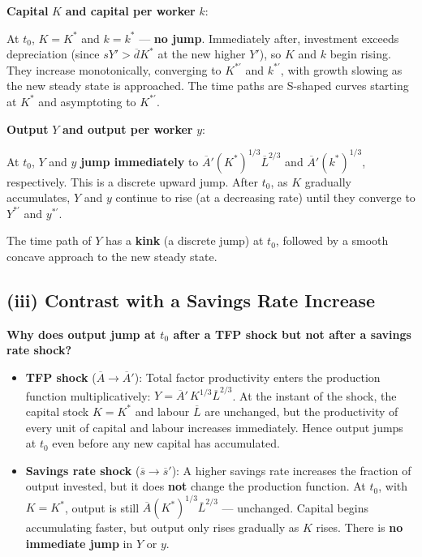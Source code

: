 \documentclass[letterpaper,12pt]{article}
\begin{document}
\noindent\textbf{Capital} $K$ \textbf{and capital per worker} $k$:

At $t_0$, $K = K^*$ and $k = k^*$ — \textbf{no jump}. Immediately after, investment exceeds depreciation (since $sY' > \overline{d}K^*$ at the new higher $Y'$), so $K$ and $k$ begin rising. They increase monotonically, converging to $K^{*\prime}$ and $k^{*\prime}$, with growth slowing as the new steady state is approached. The time paths are S-shaped curves starting at $K^*$ and asymptoting to $K^{*\prime}$.

\noindent\textbf{Output} $Y$ \textbf{and output per worker} $y$:

At $t_0$, $Y$ and $y$ \textbf{jump immediately} to $\overline{A}'(K^*)^{1/3}\overline{L}^{2/3}$ and $\overline{A}'(k^*)^{1/3}$, respectively. This is a discrete upward jump. After $t_0$, as $K$ gradually accumulates, $Y$ and $y$ continue to rise (at a decreasing rate) until they converge to $Y^{*\prime}$ and $y^{*\prime}$.

The time path of $Y$ has a \textbf{kink} (a discrete jump) at $t_0$, followed by a smooth concave approach to the new steady state.

\subsection*{(iii) Contrast with a Savings Rate Increase}

\textbf{Why does output jump at $t_0$ after a TFP shock but not after a savings rate shock?}

\begin{itemize}
  \item \textbf{TFP shock} ($\overline{A} \to \overline{A}'$): Total factor productivity enters the production function multiplicatively: $Y = \overline{A}'\,K^{1/3}\overline{L}^{2/3}$. At the instant of the shock, the capital stock $K = K^*$ and labour $\overline{L}$ are unchanged, but the productivity of every unit of capital and labour increases immediately. Hence output jumps at $t_0$ even before any new capital has accumulated.

  \item \textbf{Savings rate shock} ($\overline{s} \to \overline{s}'$): A higher savings rate increases the fraction of output invested, but it does \textbf{not} change the production function. At $t_0$, with $K = K^*$, output is still $\overline{A}(K^*)^{1/3}\overline{L}^{2/3}$ — unchanged. Capital begins accumulating faster, but output only rises gradually as $K$ rises. There is \textbf{no immediate jump} in $Y$ or $y$.
\end{itemize}
\end{document}
